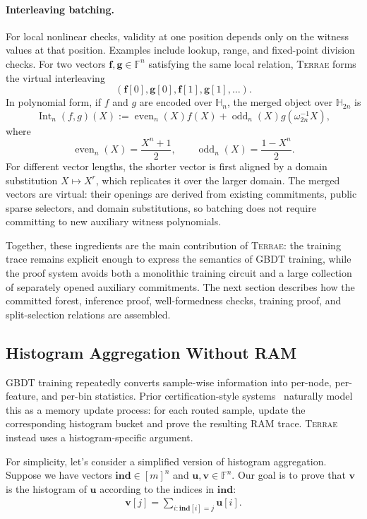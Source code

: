 \paragraph{Interleaving batching.}
For local nonlinear checks, validity at one position depends only on the
witness values at that position. Examples include lookup, range, and
fixed-point division checks. For two vectors
$\mathbf{f},\mathbf{g}\in\mathbb{F}^n$ satisfying the same local relation,
\textsc{Terrae} forms the virtual interleaving
\[
    (\mathbf{f}[0],\mathbf{g}[0],\mathbf{f}[1],\mathbf{g}[1],\ldots).
\]
In polynomial form, if $f$ and $g$ are encoded over $\mathbb{H}_n$, the merged
object over $\mathbb{H}_{2n}$ is
\[
    \operatorname{Int}_n(f,g)(X)
    :=
    \operatorname{even}_n(X)f(X)
    +\operatorname{odd}_n(X)g(\omega_{2n}^{-1}X),
\]
where
\[
    \operatorname{even}_n(X)=\frac{X^n+1}{2},
    \qquad
    \operatorname{odd}_n(X)=\frac{1-X^n}{2}.
\]
For different vector lengths, the shorter vector is first aligned by a domain
substitution $X\mapsto X^r$, which replicates it over the larger domain. The
merged vectors are virtual: their openings are derived from existing
commitments, public sparse selectors, and domain substitutions, so batching
does not require committing to new auxiliary witness polynomials.

Together, these ingredients are the main contribution of \textsc{Terrae}: the
training trace remains explicit enough to express the semantics of GBDT
training, while the proof system avoids both a monolithic training circuit and
a large collection of separately opened auxiliary commitments. The next section
describes how the committed forest, inference proof, well-formedness checks,
training proof, and split-selection relations are assembled.


\subsection{Histogram Aggregation Without RAM}

GBDT training repeatedly converts sample-wise information into per-node,
per-feature, and per-bin statistics. Prior certification-style systems~\cite{sparrow24,zkboost26}
naturally model this as a memory update process: for each routed sample, update
the corresponding histogram bucket and prove the resulting RAM trace.
\textsc{Terrae} instead uses a histogram-specific argument.

For simplicity, let's consider a simplified version of histogram aggregation.
Suppose we have vectors $\mathbf{ind}\in [m]^n$ and $\mathbf{u}, \mathbf{v}\in \mathbb{F}^n$.
Our goal is to prove that $\mathbf{v}$ is the histogram
of $\mathbf{u}$ according to the indices in $\mathbf{ind}$:
\begin{align}
    \mathbf{v}[j]=\sum_{i:\mathbf{ind}[i]=j}\mathbf{u}[i].
\end{align}

